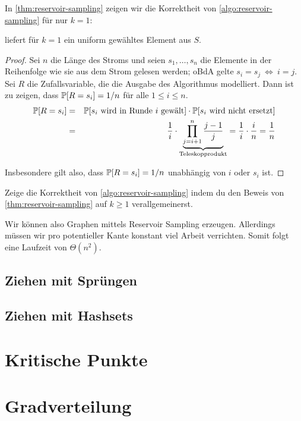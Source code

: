 \bigskip
\bigskip

\noindent
In \cref{thm:reservoir-sampling} zeigen wir die Korrektheit von \cref{algo:reservoir-sampling} für nur $k = 1$:
\begin{theorem}\label{thm:reservoir-sampling}
     liefert für $k=1$ ein uniform gewähltes Element aus $S$.
\end{theorem}
\begin{proof}
    Sei $n$ die Länge des Stroms und seien $s_1, \ldots, s_n$ die Elemente in der Reihenfolge wie sie aus dem Strom gelesen werden; oBdA gelte $s_i = s_j \ \Leftrightarrow\ i = j$.
    Sei $R$ die Zufallsvariable, die die Ausgabe des Algorithmus modelliert.
    Dann ist zu zeigen, dass $\mathbb{P}\!\left[R = s_i\right] = 1 / n$ für alle $1 \le i \le n$.
    \begin{eqnarray}
        \mathbb{P}\!\left[R = s_i\right] &=& \mathbb{P}\!\left[\text{$s_i$ wird in Runde~$i$ gewält}\right] \cdot \mathbb{P}\!\left[\text{$s_i$ wird nicht ersetzt}\right] \\
        &=& \frac{1}{i} \cdot \underbrace{\prod_{j=i+1}^n \frac{j-1}{j}}_{\text{Teleskopprodukt}}
        = \frac{1}{i} \cdot \frac{i}{n} = \frac{1}{n}
    \end{eqnarray}

    \noindent Insbesondere gilt also, dass $\mathbb{P}\!\left[R = s_i\right] = 1/n$ unabhängig von $i$ oder $s_i$ ist.
\end{proof}

\begin{exercise}
    Zeige die Korrektheit von \cref{algo:reservoir-sampling} indem du den Beweis von \cref{thm:reservoir-sampling} auf $k \ge 1$ verallgemeinerst.
\end{exercise}

Wir können also \Gnm Graphen mittels Reservoir Sampling erzeugen.
Allerdings müssen wir pro potentieller Kante konstant viel Arbeit verrichten.
Somit folgt eine Laufzeit von $\Theta(n^2)$.

\subsection{Ziehen mit Sprüngen}

\subsection{Ziehen mit Hashsets}


\section{Kritische Punkte}


\section{Gradverteilung}
